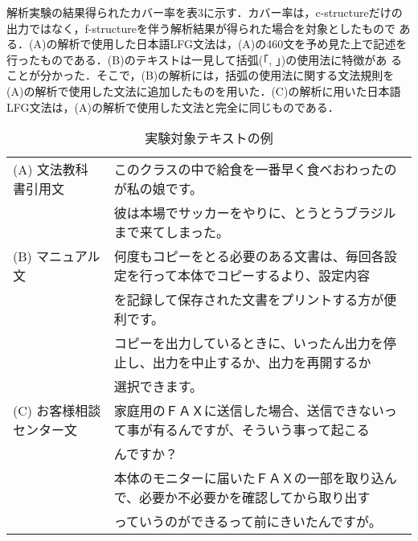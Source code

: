 解析実験の結果得られたカバー率を表3に示す．カバー率は，c-structureだけの
出力ではなく，f-structureを伴う解析結果が得られた場合を対象としたもので
ある．(A)の解析で使用した日本語LFG文法は，(A)の460文を予め見た上で記述を
行ったものである．(B)のテキストは一見して括弧(「, 」)の使用法に特徴があ
ることが分かった．そこで，(B)の解析には，括弧の使用法に関する文法規則を
(A)の解析で使用した文法に追加したものを用いた．(C)の解析に用いた日本語
LFG文法は，(A)の解析で使用した文法と完全に同じものである．
\begin{table}[htbp]
\caption{実験対象テキストの例}
\begin{tabular}{ll}
\hline
\footnotesize (A) 文法教科書引用文&
\scriptsize このクラスの中で給食を一番早く食べおわったのが私の娘です。\\
&\scriptsize 彼は本場でサッカーをやりに、とうとうブラジルまで来てしまった。\\
\footnotesize (B) マニュアル文&
\vspace{-1.5mm}
\scriptsize 何度もコピーをとる必要のある文書は、毎回各設定を行って本体でコピーするより、設定内容\\
&\scriptsize を記録して保存された文書をプリントする方が便利です。\\
\vspace{-1.5mm}
&\scriptsize コピーを出力しているときに、いったん出力を停止し、出力を中止するか、出力を再開するか\\
&\scriptsize 選択できます。\\
\footnotesize (C) お客様相談センター文&
\vspace{-1.5mm}
\scriptsize 家庭用のＦＡＸに送信した場合、送信できないって事が有るんですが、そういう事って起こる\\
&\scriptsize んですか？\\
\vspace{-1.5mm}
&\scriptsize 本体のモニターに届いたＦＡＸの一部を取り込んで、必要か不必要かを確認してから取り出す\\
&\scriptsize っていうのができるって前にきいたんですが。\\
\hline
\end{tabular}
\label{table2}
\end{table}
\normalsize

